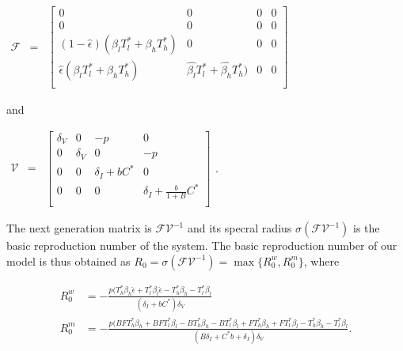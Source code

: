 \documentclass[11pt, oneside]{article}    %
\begin{document}
\vspace{5mm}


\begin{center}
$\begin{array}{rcl}
{\mathcal F} & = & \begin{bmatrix}
 0 & 0 & 0 & 0\\
0 & 0 & 0 & 0\\
(1-\hat{\epsilon}) ( \beta_l T_l^* + \beta_h T_h^*) & 0 & 0 & 0\\
\hat{\epsilon} ( \beta_l T_l^* + \beta_h T_h^*) & \hat{\beta_l} T_l^* + \hat{ \beta_h} T_h^*) & 0 & 0\\
\end{bmatrix}
\end{array}$
\end{center}

\vspace{5mm}

and 

\vspace{5mm}


\begin{center}
$\begin{array}{rcl}
{\mathcal V} & = & \begin{bmatrix}
\delta_V & 0 & -p & 0\\
0 & \delta_V & 0 & -p\\
0 & 0 & \delta_I + b C^* & 0\\
0 & 0 & 0 & \delta_I + \frac{b}{1+B} C^*\\
\end{bmatrix}
\end{array}$.
\end{center}

\vspace{5mm}


The next generation matrix is ${\mathcal F \mathcal V}^{-1}$ and its specral radius $\sigma(\mathcal F \mathcal V^{-1})$ is the basic reproduction number of the system. The basic reproduction number of our model is thus obtained as $R_0 = \sigma(\mathcal F \mathcal V^{-1}) = \max\{R_0^w,R_0^m\}$, where 

\begin{align*}
R_0^w & = -\frac{p (T_h^* \beta_h \hat{\epsilon} + T_l^*\beta_l \hat{\epsilon} - T_h^* \beta_h - T_l^* \beta_l} {(\delta_I + b C^*) \delta_V}\\
R_0^m &= -\frac{p ( BFT_h^* \beta_h + BFT_l^*\beta_l - BT_h^* \beta_h - BT_l^* \beta_l + FT_h^* \beta_h + FT_l^* \beta_l - T_h^* \beta_h - T_l^* \beta_l}{(B\delta_I + C^* b + \delta_I)\delta_V}.    \\
\end{align*}
\end{document}
